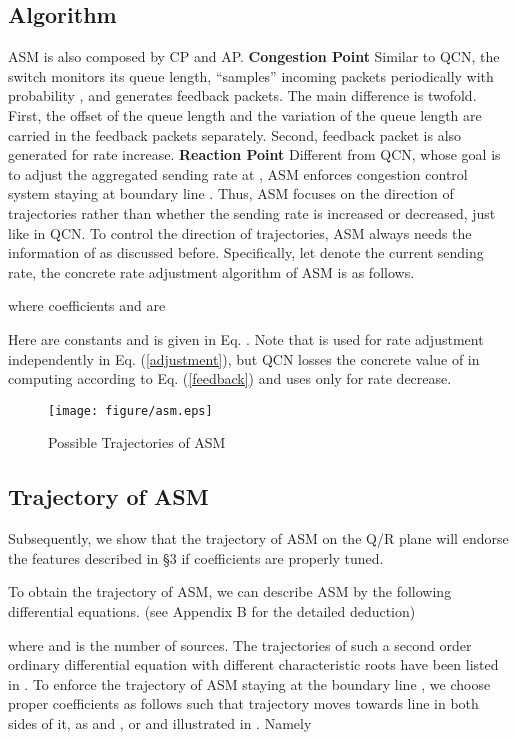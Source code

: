 \documentclass{sig-alternate-10pt}
\begin{document}
\subsection{Algorithm}
ASM is also composed by CP and AP. \newline
\textbf{Congestion Point} Similar to QCN, the switch monitors its queue length, ``samples'' incoming packets periodically with probability , and generates feedback packets. The main difference is twofold. First, the offset of the queue length  and the variation of the queue length  are carried in the feedback packets separately. Second, feedback packet is also generated for rate increase. \newline
\textbf{Reaction Point} 
Different from QCN, whose goal is to adjust the aggregated sending rate at , ASM enforces congestion control system staying at boundary line . Thus, ASM focuses on the direction of trajectories rather than whether the sending rate is increased or decreased, just like in QCN. To control the direction of trajectories, ASM always needs the information of  as discussed before. Specifically, let  denote the current sending rate, the concrete rate adjustment algorithm of ASM is as follows.

where coefficients  and  are

Here  are constants and  is given in Eq. . Note that  is used for rate adjustment independently in Eq. (\ref{adjustment}), but QCN losses the concrete value of  in computing  according to Eq. (\ref{feedback}) and uses  only for rate decrease. 


\begin{figure}
\centering
\texttt{[image: figure/asm.eps]}
\caption{Possible Trajectories of ASM}
\label{asm-trajectory}
\end{figure}

\subsection{Trajectory of ASM}
Subsequently, we show that the trajectory of ASM on the Q/R plane will endorse the features described in \S3 if coefficients  are properly tuned.

To obtain the trajectory of ASM, we can describe ASM by the following differential equations. (see Appendix B for the detailed deduction)

where  and  is the number of sources. The trajectories of such a second order ordinary differential equation with different characteristic roots have been listed in . To enforce the trajectory of ASM staying at the boundary line , we choose proper coefficients as follows such that trajectory moves towards line  in both sides of it, as  and , or  and  illustrated in . Namely
\end{document}
